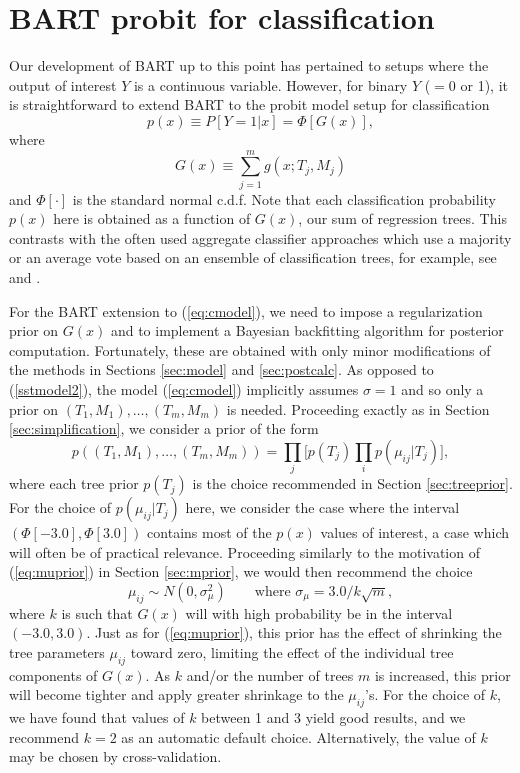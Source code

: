 \documentclass[aoas,nameyear,dvips]{arximspdf}
\newcommand{\citeasnoun}[1]{\citet{#1}}
\begin{document}
\section{BART probit for classification}\label{sec:classification}

Our development of BART up to this point has pertained to setups where
the output of interest $Y$ is a continuous variable.  However, for
binary $Y$ ($= 0$ or 1), it is straightforward to extend BART to the
probit model setup for classification
\begin{equation}\label{eq:cmodel}
p(x) \equiv P[Y = 1  | x] = \Phi[G(x)],
\end{equation}
where
\begin{equation}
G(x) \equiv \sum_{j=1}^m g(x; T_j,M_j)
\end{equation}
and $\Phi[\cdot]$ is the standard normal c.d.f.  Note that each
classification probability $p(x)$ here is obtained as a function of
$G(x)$, our sum of regression trees.  This contrasts with the often
used aggregate classifier approaches which use a majority or an average
vote based on an ensemble of classification trees, for example, see
\citeasnoun{AmitGema1997} and \citeasnoun{Bre2001}.

For the BART extension to (\ref{eq:cmodel}), we need to impose a
regularization prior on $G(x)$ and to implement a Bayesian backfitting
algorithm for posterior computation.  Fortunately, these are obtained
with only minor modifications of the methods in Sections
\ref{sec:model} and \ref{sec:postcalc}. As opposed to
(\ref{sstmodel2}), the model (\ref{eq:cmodel}) implicitly assumes
$\sigma = 1$ and so only a prior on $(T_1,M_1),\ldots,(T_m,M_m)$ is
needed.  Proceeding exactly as in Section \ref{sec:simplification}, we
consider a prior of the form
\begin{equation}
p((T_1,M_1),\ldots,(T_m,M_m))= \prod_j  \biggl[p(T_j) \prod_i p(\mu_{ij} | T_j)  \biggr],
\end{equation}
where each tree prior $p(T_j)$ is the choice recommended in  Section
\ref{sec:treeprior}.   For the choice of $p(\mu_{ij} | T_j)$ here, we
consider the case where the interval $(\Phi[-3.0], \Phi[3.0])$ contains
most of the $p(x)$ values of interest, a case which will often be of
practical relevance.  Proceeding similarly to the motivation of
(\ref{eq:muprior}) in Section \ref{sec:mprior}, we would then recommend
the choice
\begin{equation}\label{eq:muprior2}
\mu_{ij} \sim N(0,\sigma_{\mu}^2)\qquad \mbox{where     }
\sigma_{\mu} = 3.0/k \sqrt{m} ,
\end{equation}
where $k$ is such that $G(x)$ will with high probability be in the interval $(-3.0,3.0)$.
Just as for (\ref{eq:muprior}), this prior has the effect of shrinking the tree parameters
$\mu_{ij}$ toward zero, limiting the effect of the individual
tree components of $G(x)$.  As $k$ and/or the number of trees $m$ is increased, this
prior will become tighter and apply greater shrinkage to the
$\mu_{ij}$'s.  For the choice of $k$, we have found
that values of $k$ between 1 and 3 yield good results, and we
recommend $k = 2$ as an automatic default choice. Alternatively,
the value of $k$ may be chosen by cross-validation.
\end{document}
